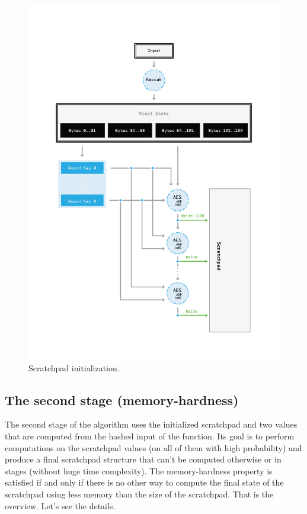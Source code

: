 \begin{figure}
  \centering
  \includegraphics[scale=0.65,keepaspectratio]{Images/Bill/initialization.png}
  \caption{Scratchpad initialization.~\cite{bill}}
  \label{fig:initialization}
\end{figure}
\clearpage

\subsection{The second stage (memory-hardness)} \label{sec:second}
The second stage of the algorithm uses the initialized scratchpad and two values that are computed from the hashed input of the function. Its goal is to perform computations on the scratchpad values (on all of them with high probability) and produce a final scratchpad structure that can't be computed otherwise or in stages (without huge time complexity). The memory-hardness property is satisfied if and only if there is no other way to compute the final state of the scratchpad using less memory than the size of the scratchpad. That is the overview. Let's see the details.

